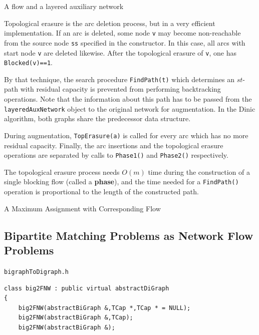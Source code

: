 \documentclass[a4paper,11pt,twoside]{book}
\begin{document}
\begin{multicols}{2}
\bigskip
\begin{figurehere}
\begin{center}
\epsfxsize=6cm
\epsfxsize=6cm
\hspace*{0.5cm}
\vspace{0.5cm}
\caption{\label{flb_auxiliary}A flow and a layered auxiliary network}
\end{center}
\end{figurehere}

\noindent
Topological erasure is the arc deletion process, but in a very efficient
implementation. If an arc is deleted, some node \verb/v/ may become
non-reachable from the source node \verb/ss/ specified in the constructor.
In this case, all arcs with start node \verb/v/ are deleted likewise. After
the topological erasure of \verb/v/, one has \verb/Blocked(v)==1/.

By that technique, the search procedure \verb/FindPath(t)/ which determines
an $st$-path with residual capacity is prevented from performing backtracking
operations. Note that the information about this path has to be passed from the
\verb/layeredAuxNetwork/ object to the original network for augmentation.
In the Dinic algorithm, both graphs share the predecessor data structure.

During augmentation, \verb/TopErasure(a)/ is called for every arc which has no
more residual capacity. Finally, the arc insertions and the topological erasure
operations are separated by calls to \verb/Phase1()/ and \verb/Phase2()/
respectively.

The topological erasure process needs $O(m)$ time during the construction of
a single blocking flow (called a {\bf phase}),
and the time needed for a \verb/FindPath()/ operation is proportional to the
length of the constructed path.

\bigskip
\begin{figurehere}
\begin{center}
\epsfxsize=3cm
\epsfxsize=6cm
\hspace*{1cm}
\vspace{0.5cm}
\caption{\label{flb_bipartite}A Maximum Assignment with Corresponding Flow}
\end{center}
\end{figurehere}


\subsection{Bipartite Matching Problems as Network Flow Problems}
\myinclude\verb/bigraphToDigraph.h/
\begin{mymethods}
\begin{verbatim}
class big2FNW : public virtual abstractDiGraph
{
    big2FNW(abstractBiGraph &,TCap *,TCap * = NULL);
    big2FNW(abstractBiGraph &,TCap);
    big2FNW(abstractBiGraph &);


\end{verbatim}
\end{mymethods}
\end{multicols}
\end{document}

